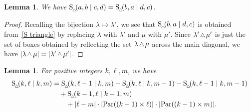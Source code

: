 \documentclass[11pt]{amsart}
\theoremstyle{plain}
\newtheorem{lemma}[theorem]{Lemma}
\theoremstyle{definition}
\numberwithin{equation}{section}
\newcommand{\Par}{{\rm Par}}
\newcommand{\smtriangle}{\scalebox{.8}{$\,\triangle\,$}}
\newcommand{\Stri}{{\rm S}_{_{\!\triangle\!\!}}}
\begin{document}
\begin{lemma}
    \label{lemma:conjugate}
    We have $\Stri(a, b \mid c,d) = \Stri(b,a \mid d,c)$.
\end{lemma}

\begin{proof}
    Recalling the bijection $\lambda \mapsto \lambda'$, we see that $\Stri(b,a \mid d,c)$ is obtained from~\eqref{S triangle} by replacing $\lambda$ with $\lambda'$ and $\mu$ with $\mu'$.
    Since $\lambda' \smtriangle \mu'$ is just the set of boxes obtained by reflecting the set $\lambda \smtriangle \mu$ across the main diagonal, we have $|\lambda \smtriangle \mu| = |\lambda' \smtriangle \mu'|$.
    \end{proof}

\begin{lemma}
    \label{lemma:construction}
    For positive integers $k, \ell, m$, we have
    \begin{align}
    \label{lemma equation}
    \begin{split}
    \Stri(k, \ell \mid k, m) &= \Stri(k, \ell-1 \mid k, m) + \Stri(k, \ell \mid k, m-1) - \Stri(k, \ell-1 \mid k, m-1) \\
    & \hspace{10pt} + \Stri(k-1, \ell \mid k-1, m) \\
    & \hspace{+20pt} + |\ell - m| \cdot |\Par((k-1) \times \ell)|\cdot |\Par((k-1) \times m)|.
    \end{split}
    \end{align}
\end{lemma}
\end{document}
